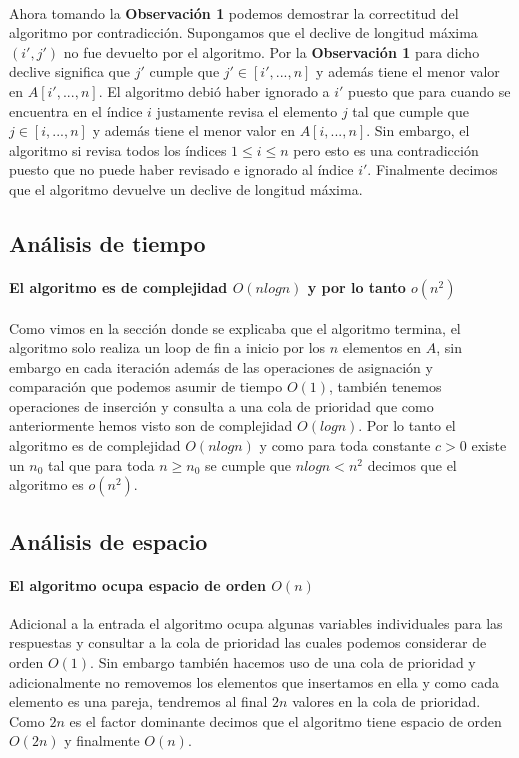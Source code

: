 \documentclass[12pt]{article}
\begin{document}
\paragraph{} Ahora tomando la \textbf{Observación 1} podemos demostrar la correctitud del algoritmo por contradicción.
Supongamos que el declive de longitud máxima $(i',j')$ no fue devuelto por el algoritmo. Por la \textbf{Observación 1} para dicho declive significa que $j'$ cumple que $j' \in [i',...,n]$ y además tiene el menor valor en $A[i',...,n]$. El algoritmo debió haber ignorado a $i'$ puesto que para cuando se encuentra en el índice $i$ justamente revisa el elemento $j$ tal que cumple que $j \in [i,...,n]$ y además tiene el menor valor en $A[i,...,n]$. Sin embargo, el algoritmo si revisa todos los índices $1 \leq i \leq n$ pero esto es una contradicción puesto que no puede haber revisado e ignorado al índice $i'$. Finalmente decimos que el algoritmo devuelve un declive de longitud máxima.
\subsection{Análisis de tiempo}
\paragraph{El algoritmo es de complejidad $O(nlogn)$ y por lo tanto $o(n^2)$} Como vimos en la sección donde se explicaba que el algoritmo termina, el algoritmo solo realiza un loop de fin a inicio por los $n$ elementos en $A$, sin embargo en cada iteración además de las operaciones de asignación y comparación que podemos asumir de tiempo $O(1)$, también tenemos operaciones de inserción y consulta a una cola de prioridad que como anteriormente hemos visto son de complejidad $O(logn)$. Por lo tanto el algoritmo es de complejidad $O(nlogn)$ y como para toda constante $c>0$ existe un $n_0$ tal que para toda $n\geq n_0$ se cumple que $nlogn < n^2$ decimos que el algoritmo es $o(n^2)$.
\subsection{Análisis de espacio}
\paragraph{El algoritmo ocupa espacio de orden $O(n)$} 
Adicional a la entrada el algoritmo ocupa algunas variables individuales para las respuestas y consultar a la cola de prioridad las cuales podemos considerar de orden $O(1)$. Sin embargo también hacemos uso de una cola de prioridad y adicionalmente no removemos los elementos que insertamos en ella y como cada elemento es una pareja, tendremos al final $2n$ valores en la cola de prioridad. Como $2n$ es el factor dominante decimos que el algoritmo tiene espacio de orden $O(2n)$ y finalmente $O(n)$.
\end{document}
